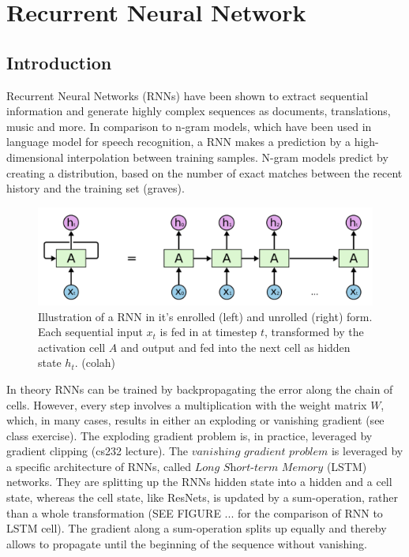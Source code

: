 
\section{Recurrent Neural Network} \label{sec:rnn}

\subsection{Introduction}

Recurrent Neural Networks (RNNs) have been shown to extract sequential information and generate highly complex sequences as documents, translations, music and more. In comparison to n-gram models, which have been used in language model for speech recognition, a RNN makes a prediction by a high-dimensional interpolation between training samples. N-gram models predict by creating a distribution, based on the number of exact matches between the recent history and the training set (graves). 


\begin{figure}
	\centering
	\includegraphics [trim=0 0 0 0, clip, angle=0, width=0.8\columnwidth,
	keepaspectratio]{figures/rnn_unrolled}
	\caption{Illustration of a RNN in it's enrolled (left) and unrolled (right) form. Each sequential input $x_t$ is fed in at timestep $t$, transformed by the activation cell $A$ and output and fed into the next cell as hidden state $h_t$. (colah)} 
	\label{fig:rnn_unrolled} 
\end{figure}

In theory RNNs can be trained by backpropagating the error along the chain of cells. However, every step involves a multiplication with the weight matrix $W$, which, in many cases, results in either an exploding or vanishing gradient (see class exercise). The exploding gradient problem is, in practice, leveraged by gradient clipping (cs232 lecture). The $\textit{vanishing gradient problem}$ is leveraged by a specific architecture of RNNs, called $\textit{Long Short-term Memory}$ (LSTM) networks. They are splitting up the RNNs hidden state into a hidden and a cell state, whereas the cell state, like ResNets, is updated by a sum-operation, rather than a whole transformation (SEE FIGURE ... for the comparison of RNN to LSTM cell). The gradient along a sum-operation splits up equally and thereby allows to propagate until the beginning of the sequence without vanishing.

